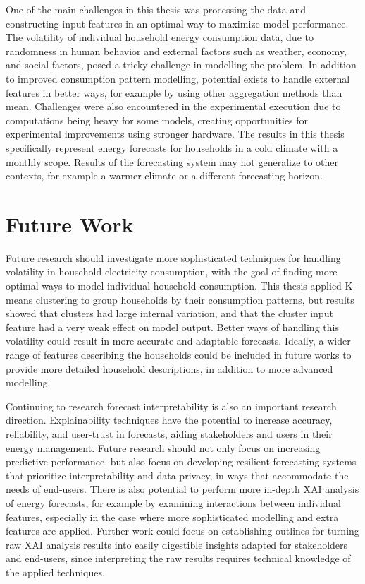 One of the main challenges in this thesis was processing the data and constructing input features in an optimal way to maximize model performance. The volatility of individual household energy consumption data, due to randomness in human behavior and external factors such as weather, economy, and social factors, posed a tricky challenge in modelling the problem. In addition to improved consumption pattern modelling, potential exists to handle external features in better ways, for example by using other aggregation methods than mean. Challenges were also encountered in the experimental execution due to computations being heavy for some models, creating opportunities for experimental improvements using stronger hardware. The results in this thesis specifically represent energy forecasts for households in a cold climate with a monthly scope. Results of the forecasting system may not generalize to other contexts, for example a warmer climate or a different forecasting horizon.

\section{Future Work}

Future research should investigate more sophisticated techniques for handling volatility in household electricity consumption, with the goal of finding more optimal ways to model individual household consumption. This thesis applied K-means clustering to group households by their consumption patterns, but results showed that clusters had large internal variation, and that the cluster input feature had a very weak effect on model output. Better ways of handling this volatility could result in more accurate and adaptable forecasts. Ideally, a wider range of features describing the households could be included in future works to provide more detailed household descriptions, in addition to more advanced modelling.

Continuing to research forecast interpretability is also an important research direction. Explainability techniques have the potential to increase accuracy, reliability, and user-trust in forecasts, aiding stakeholders and users in their energy management. Future research should not only focus on increasing predictive performance, but also focus on developing resilient forecasting systems that prioritize interpretability and data privacy, in ways that accommodate the needs of end-users. There is also potential to perform more in-depth XAI analysis of energy forecasts, for example by examining interactions between individual features, especially in the case where more sophisticated modelling and extra features are applied. Further work could focus on establishing outlines for turning raw XAI analysis results into easily digestible insights adapted for stakeholders and end-users, since interpreting the raw results requires technical knowledge of the applied techniques.